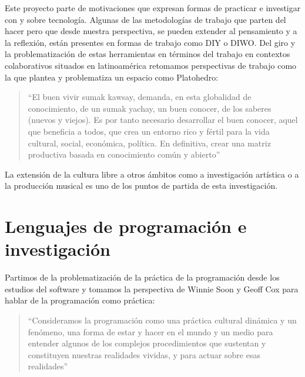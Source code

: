 Este proyecto parte de motivaciones que expresan formas de practicar e investigar con y sobre tecnología. Algunas de las metodologías de trabajo que parten del hacer pero que desde nuestra perspectiva, se pueden extender al pensamiento y a la reflexión, están presentes en formas de trabajo como DIY o DIWO. Del giro y la problematización de estas herramientas en términos del trabajo en contextos colaborativos situados en latinoamérica retomamos perspectivas de trabajo como la que plantea y problematiza un espacio como Platohedro:

\begin{quote}

  ``El buen vivir sumak kawsay, demanda, en esta globalidad de conocimiento, de un sumak yachay, un buen conocer, de los saberes (nuevos y viejos). Es por tanto necesario desarrollar el buen conocer, aquel que beneficia a todos, que crea un entorno rico y fértil para la vida cultural, social, económica, política. En definitiva, crear una matriz productiva basada en conocimiento común y abierto''\citep[p.~31]{platohedro}

\end{quote}


La extensión de la cultura libre a otros ámbitos como a investigación artística o a la producción musical es uno de los puntos de partida de esta investigación. 

\section{Lenguajes de programación e investigación} %

Partimos de la problematización de la práctica de la programación desde los estudios del software y tomamos la perspectiva de Winnie Soon y Geoff Cox para hablar de la programación como práctica:

\begin{quote}

``Consideramos la programación como una práctica cultural dinámica y un fenómeno, una forma de estar y hacer en el mundo y un medio para entender algunos de los complejos procedimientos que sustentan y constituyen nuestras realidades vividas, y para actuar sobre esas realidades'' \citep[p.~14]{aestheticProgramming}
  
\end{quote}

